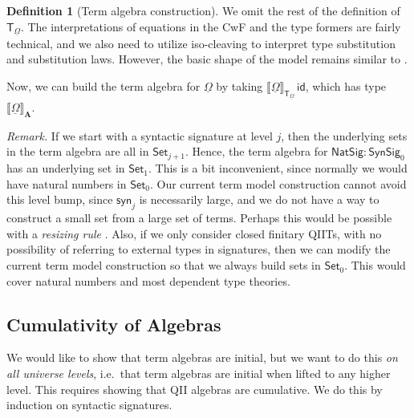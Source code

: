 \documentclass{article}
\theoremstyle{definition}
\newtheorem{definition}{Definition}
\theoremstyle{theorem}
\newcommand{\id}{\mathsf{id}}
\newcommand{\Set}{\mathsf{Set}}
\newcommand{\NatSig}{\mathsf{NatSig}}
\newcommand{\syn}{\mathsf{syn}}
\newcommand{\SynSig}{\mathsf{SynSig}}
\newcommand{\bA}{\boldsymbol{A}}
\newcommand{\bT}{\boldsymbol{\mathsf{T}}}
\newcommand{\ul}[1]{\underline{#1}}
\newcommand{\ulOmega}{\ul{\Omega}}
\newcommand{\llb}{\llbracket}
\newcommand{\rrb}{\rrbracket}
\begin{document}
\begin{definition}[Term algebra construction]
We omit the rest of the definition of $\bT_{\ulOmega}$. The interpretations of
equations in the CwF and the type formers are fairly technical, and we also
need to utilize iso-cleaving to interpret type substitution and substitution
laws. However, the basic shape of the model remains similar to
\cite{kaposi2019constructing}.
\end{definition}

Now, we can build the term algebra for $\ulOmega$ by taking
$\llb\ulOmega\rrb_{\bT_{\ulOmega}}\,\id$, which has type $\llb\ulOmega\rrb_{\bA}$.

\emph{Remark.} If we start with a syntactic signature at level $j$, then the
underlying sets in the term algebra are all in $\Set_{j+1}$. Hence, the term
algebra for $\NatSig : \SynSig_0$ has an underlying set in $\Set_1$. This is
a bit inconvenient, since normally we would have natural numbers in $\Set_0$. Our
current term model construction cannot avoid this level bump, since $\syn_j$ is
necessarily large, and we do not have a way to construct a small set from
a large set of terms. Perhaps this would be possible with a \emph{resizing rule}
\cite{voevodsky2011resizing}. Also, if we only consider closed finitary QIITs,
with no possibility of referring to external types in signatures, then we can
modify the current term model construction so that we always build sets in
$\Set_0$. This would cover natural numbers and most dependent type theories.

\subsection{Cumulativity of Algebras}

We would like to show that term algebras are initial, but we want to do this
\emph{on all universe levels}, i.e.\ that term algebras are initial when lifted
to any higher level. This requires showing that QII algebras are
cumulative. We do this by induction on syntactic signatures.
\end{document}
